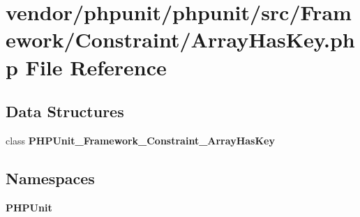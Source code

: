 \section{vendor/phpunit/phpunit/src/\+Framework/\+Constraint/\+Array\+Has\+Key.php File Reference}
\label{_array_has_key_8php}
\subsection*{Data Structures}
\begin{DoxyCompactItemize}
\item 
class {\bf P\+H\+P\+Unit\+\_\+\+Framework\+\_\+\+Constraint\+\_\+\+Array\+Has\+Key}
\end{DoxyCompactItemize}
\subsection*{Namespaces}
\begin{DoxyCompactItemize}
\item 
 {\bf P\+H\+P\+Unit}
\end{DoxyCompactItemize}
